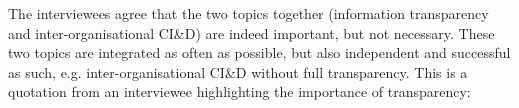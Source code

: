 %
%
%
%
%
%
%
%
 The interviewees agree that the two topics together (information transparency and inter-organisational CI\&D) are indeed important, but not necessary. These two topics are integrated as often as possible, but also independent and successful as such, e.g. inter-organisational CI\&D without full transparency. This is a quotation from an interviewee highlighting the importance of transparency:

